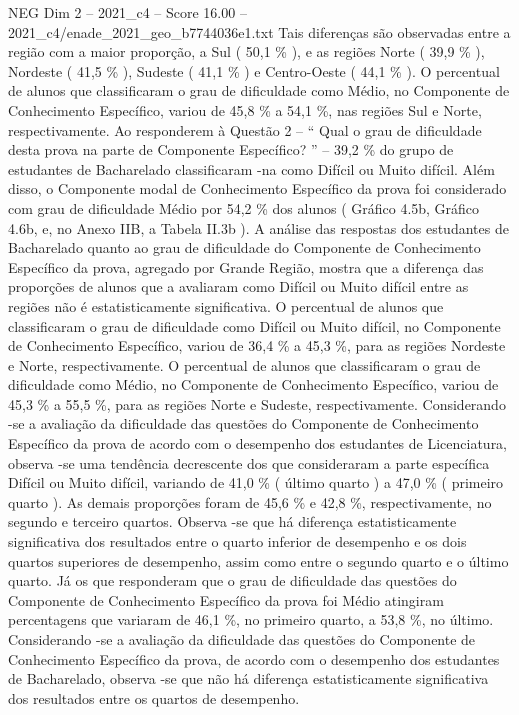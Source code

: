 \begin{textsample}{NEG Dim 2 – 2021\_c4 – Score 16.00 – 2021\_c4/enade\_2021\_geo\_b7744036e1.txt}
Tais diferenças são observadas entre a região com a maior proporção, a Sul ( 50,1 \% ), e as regiões Norte ( 39,9 \% ), Nordeste ( 41,5 \% ), Sudeste ( 41,1 \% ) e Centro-Oeste ( 44,1 \% ).
O percentual de alunos que classificaram o grau de dificuldade como Médio, no Componente de Conhecimento Específico, variou de 45,8 \% a 54,1 \%, nas regiões Sul e Norte, respectivamente.
Ao responderem à Questão 2 – “ Qual o grau de dificuldade desta prova na parte de Componente Específico? ” – 39,2 \% do grupo de estudantes de Bacharelado classificaram -na como Difícil ou Muito difícil.
Além disso, o Componente modal de Conhecimento Específico da prova foi considerado com grau de dificuldade Médio por 54,2 \% dos alunos ( Gráfico 4.5b, Gráfico 4.6b, e, no Anexo IIB, a Tabela II.3b ).
A análise das respostas dos estudantes de Bacharelado quanto ao grau de dificuldade do Componente de Conhecimento Específico da prova, agregado por Grande Região, mostra que a diferença das proporções de alunos que a avaliaram como Difícil ou Muito difícil entre as regiões não é estatisticamente significativa.
O percentual de alunos que classificaram o grau de dificuldade como Difícil ou Muito difícil, no Componente de Conhecimento Específico, variou de 36,4 \% a 45,3 \%, para as regiões Nordeste e Norte, respectivamente.
O percentual de alunos que classificaram o grau de dificuldade como Médio, no Componente de Conhecimento Específico, variou de 45,3 \% a 55,5 \%, para as regiões Norte e Sudeste, respectivamente.
Considerando -se a avaliação da dificuldade das questões do Componente de Conhecimento Específico da prova de acordo com o desempenho dos estudantes de Licenciatura, observa -se uma tendência decrescente dos que consideraram a parte específica Difícil ou Muito difícil, variando de 41,0 \% ( último quarto ) a 47,0 \% ( primeiro quarto ).
As demais proporções foram de 45,6 \% e 42,8 \%, respectivamente, no segundo e terceiro quartos.
Observa -se que há diferença estatisticamente significativa dos resultados entre o quarto inferior de desempenho e os dois quartos superiores de desempenho, assim como entre o segundo quarto e o último quarto.
Já os que responderam que o grau de dificuldade das questões do Componente de Conhecimento Específico da prova foi Médio atingiram percentagens que variaram de 46,1 \%, no primeiro quarto, a 53,8 \%, no último.
Considerando -se a avaliação da dificuldade das questões do Componente de Conhecimento Específico da prova, de acordo com o desempenho dos estudantes de Bacharelado, observa -se que não há diferença estatisticamente significativa dos resultados entre os quartos de desempenho.

\end{textsample}
